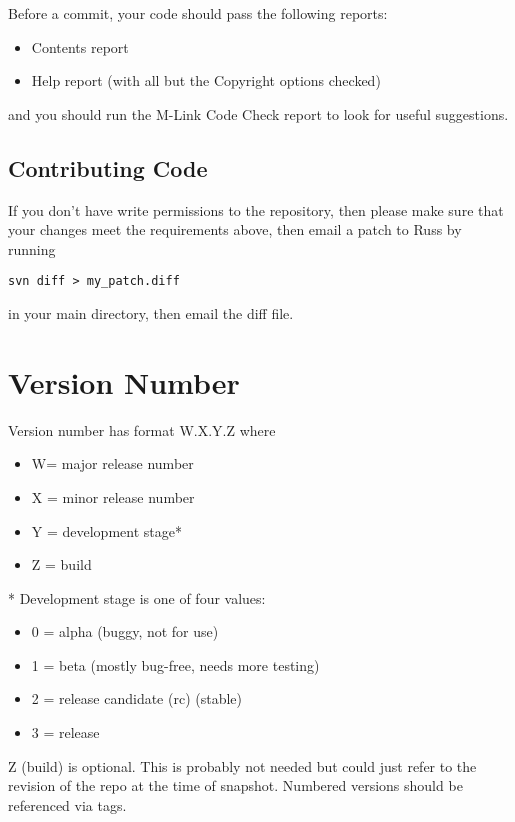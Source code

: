   Before a commit, your code should pass the following reports:
\begin{itemize}
 \item Contents report
  \item  Help report  (with all but the Copyright options checked)
\end{itemize}
  and you should run the M-Link Code Check report to look for useful suggestions.

\subsection{Contributing Code}

If you don't have write permissions to the repository, then please make sure that your changes meet the requirements above, then email a patch to Russ by running 
\begin{lstlisting}
svn diff > my_patch.diff
\end{lstlisting}
in your main \drake directory, then email the diff file.

\section{Version Number}

Version number has format W.X.Y.Z where
\begin{itemize}
\item W= major release number
\item X = minor release number
\item Y = development stage*
\item Z = build
\end{itemize}
* Development stage is one of four values:
\begin{itemize}
\item 0 = alpha (buggy, not for use)
\item 1 = beta (mostly bug-free, needs more testing)
\item 2 = release candidate (rc) (stable)
\item 3 = release
\end{itemize}
Z (build) is optional. This is probably not needed but could just refer to the revision of the repo at the time of snapshot. Numbered versions should be referenced via tags.
